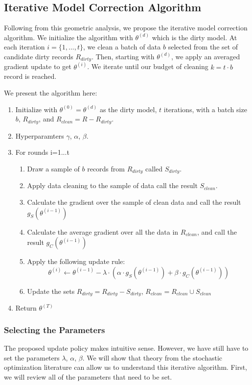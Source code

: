 \subsection{Iterative Model Correction Algorithm}
Following from this geometric analysis, we propose the iterative model correction algorithm.
We initialize the algorithm with $\theta^{(d)}$ which is the dirty model.
At each iteration $i=\{1,...,t\}$, we clean a batch of data $b$ selected from the set of candidate dirty records $R_{dirty}$.
Then, starting with $\theta^{(d)}$, we apply an averaged gradient update to get $\theta^{(i)}$.
We iterate until our budget of cleaning $k = t \cdot b$ record is reached.

We present the algorithm here:
\begin{enumerate}[noitemsep]
\item Initialize with $\theta^{(0)} = \theta^{(d)}$ as the dirty model, $t$ iterations, with a batch size $b$, $R_{dirty}$, and $R_{clean} = R - R_{dirty}$.
\item Hyperparamters $\gamma$, $\alpha$, $\beta$.
\item For rounds i=1...t
\begin{enumerate}
	\item Draw a sample of $b$ records from $R_{dirty}$ called $S_{dirty}$.
	\item Apply data cleaning to the sample of data call the result $S_{clean}$.
	\item Calculate the gradient over the sample of clean data and call the result $g_S(\theta^{(i-1)})$
	\item Calculate the average gradient over all the data in $R_{clean}$, and call the result $g_C(\theta^{(i-1)})$
	\item Apply the following update rule:
	\[
	\theta^{(i)} \leftarrow \theta^{(i-1)} - \lambda \cdot(\alpha\cdot g_S(\theta^{(i-1)}) + \beta \cdot  g_C(\theta^{(i-1)}))
	\]
	\item Update the sets $R_{dirty} = R_{dirty} - S_{dirty}$, $R_{clean} = R_{clean} \cup S_{clean}$
\end{enumerate}
\item Return $\theta^{(T)}$
\end{enumerate} 

\subsubsection{Selecting the Parameters}
The proposed update policy makes intuitive sense.
However, we have still have to set the parameters $\lambda$, $\alpha$, $\beta$.
We will show that theory from the stochastic optimization literature can allow us to understand this iterative algorithm.
First, we will review all of the parameters that need to be set.

